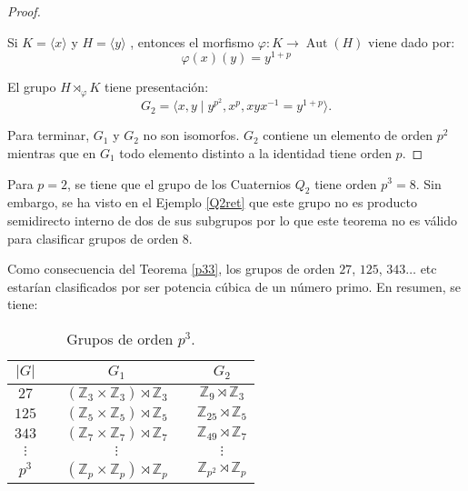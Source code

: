 \begin{proof}
\begin{enumerate}
    Si $K=\langle x \rangle$ y $H= \langle y \rangle$ , entonces el morfismo $\varphi \colon K \to \operatorname{Aut}(H)$ viene dado por:%
    \[
    \varphi(x)(y)=y^{1+p}
    \]
    
    El grupo $H \rtimes_{\varphi} K$   tiene presentación:
    \[
    G_2 = \langle x,y \mid y^{p^2}, x^p, xyx^{-1}=y^{1+p} \rangle .
    \]
    

\end{enumerate}
Para terminar, $G_1$ y $G_2$ no son isomorfos. $G_2$ contiene un elemento de orden $p^2$ mientras que en $G_1$ todo elemento distinto a la identidad tiene orden $p$.
\end{proof}

\begin{remark}
Para $p=2$, se tiene que el grupo de los Cuaternios $Q_2$ tiene orden $p^3=8$. Sin embargo, se ha visto en el Ejemplo \ref{Q2ret} que este grupo no es producto semidirecto interno de dos de sus subgrupos por lo que este teorema no es válido para clasificar grupos de orden 8. 
\end{remark}


Como consecuencia del Teorema \ref{p33}, los grupos de orden $27$, $125$, $343 \ldots$ etc estarían clasificados por ser potencia cúbica de un número primo. En resumen, se tiene:
\begin{table}[H]
\centering
\begin{tabular}{@{}clclc@{}}
\textbf{$|G|$} &  & \textbf{$G_1$}                                            &  & \textbf{$G_2$}                          \\ \midrule
\textbf{$27$}  &  & $(\mathbb{Z}_3 \times \mathbb{Z}_3) \rtimes \mathbb{Z}_3$ &  & $\mathbb{Z}_9  \rtimes \mathbb{Z}_3$    \\
\textbf{$125$} &  & $(\mathbb{Z}_5 \times \mathbb{Z}_5) \rtimes \mathbb{Z}_5$ &  & $\mathbb{Z}_{25}  \rtimes \mathbb{Z}_5$ \\
\textbf{$343$} &  & $(\mathbb{Z}_7 \times \mathbb{Z}_7) \rtimes \mathbb{Z}_7$ &  & $\mathbb{Z}_{49}  \rtimes \mathbb{Z}_7$ \\
$\vdots$       &  & $\vdots$                                                  &  & $\vdots$                                \\
\textbf{$p^3$} &  & $(\mathbb{Z}_p \times \mathbb{Z}_p) \rtimes \mathbb{Z}_p$ &  & $\mathbb{Z}_{p^2} \rtimes \mathbb{Z}_p$ \\ \bottomrule
\end{tabular}
\caption{Grupos de orden $p^3$.}
\label{tablep3}
\end{table}


